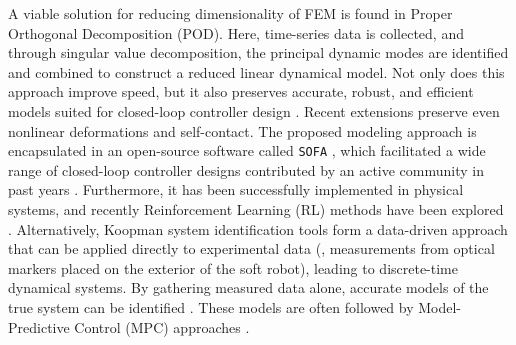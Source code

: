 A viable solution for reducing dimensionality of FEM is found in Proper Orthogonal Decomposition (POD). Here, time-series data is collected, and through singular value decomposition, the principal dynamic modes are identified and combined to construct a reduced linear dynamical model. Not only does this approach improve speed, but it also preserves accurate, robust, and efficient models suited for closed-loop controller design \cite{Goury2018}. Recent extensions \cite{Sifakis2012Aug} preserve even nonlinear deformations and self-contact. The proposed modeling approach is encapsulated in an open-source software called \texttt{SOFA} \cite{Duriez2016, Coevoet2017Feb}, which facilitated a wide range of closed-loop controller designs contributed by an active community in past years \cite{Largilliere2015,Goury2018,Duriez2016,Wu2021Feb,Li2022Feb}. Furthermore, it has been successfully implemented in physical systems, and recently Reinforcement Learning (RL) methods have been explored \cite{Schegg2022}. Alternatively, Koopman system identification tools form a data-driven approach that can be applied directly to experimental data (\eg, measurements from optical markers placed on the exterior of the soft robot), leading to discrete-time dynamical systems. By gathering measured data alone, accurate models of the true system can be identified \cite{Bruder2019,Komeno2022Oct}. These models are often followed by Model-Predictive Control (MPC) approaches \cite{Bruder2020Dec,Bruder2019}. 


